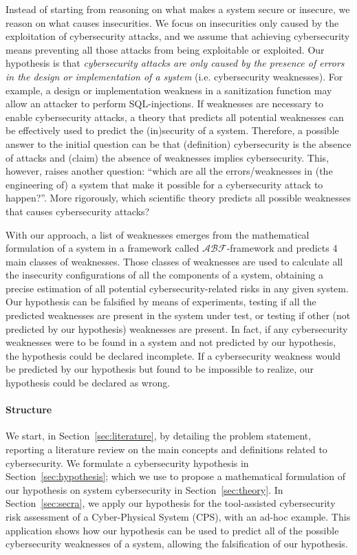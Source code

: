 \documentclass[conference]{IEEEtran}
\newcommand{\assertionRegion}{\mathcal{A}}
\newcommand{\beliefRegion}{\mathcal{B}}
\newcommand{\factRegion}{\mathcal{F}}
\newcommand{\abftheory}{\assertionRegion\beliefRegion\factRegion}
\begin{document}
Instead of starting from reasoning on what makes a system secure or insecure,
we reason on what causes insecurities. 
We focus on insecurities only caused by
the exploitation of cybersecurity attacks, and we assume that achieving
cybersecurity means preventing all those attacks from being exploitable or
exploited.  Our hypothesis is that \emph{cybersecurity attacks are only caused by the
presence of errors in the design or implementation of a system} (i.e.
cybersecurity weaknesses).  For example, a design or implementation weakness in
a sanitization function may allow an attacker to perform SQL-injections. If
weaknesses are necessary to enable cybersecurity attacks, a theory that
predicts all potential weaknesses can be effectively used to predict the
(in)security of a system.  Therefore, a possible answer to the initial question
can be that (definition) cybersecurity is the absence of attacks and (claim)
the absence of weaknesses implies cybersecurity.  This, however, raises another
question: ``which are all the errors/weaknesses in (the engineering of) a
system that make it possible for a cybersecurity attack to happen?''. More
rigorously, which scientific theory predicts all possible weaknesses that
causes cybersecurity attacks? 

With our approach, a list of weaknesses emerges from the mathematical
formulation of a system in a framework called $\abftheory$-framework and
predicts 4 main classes of weaknesses. Those classes of weaknesses are used to
calculate all the insecurity configurations of all the components of a system,
obtaining a precise estimation of all potential cybersecurity-related risks in
any given system. Our hypothesis can be falsified by means of experiments,
testing if all the predicted weaknesses are present in the system under test,
or testing if other (not predicted by our hypothesis) weaknesses are present.
In fact, if any cybersecurity weaknesses were to be found in a system and not
predicted by our hypothesis, the hypothesis could be declared incomplete.  If a
cybersecurity weakness would be predicted by our hypothesis but found to be impossible
to realize, our hypothesis could be declared as wrong.


\paragraph{Structure} 
We start, in Section~\ref{sec:literature}, by detailing the problem statement,
reporting a literature review on the main concepts and definitions related to
cybersecurity.  We formulate a cybersecurity hypothesis in Section~\ref{sec:hypothesis};
which we use to propose a mathematical formulation of our hypothesis on system cybersecurity in
Section~\ref{sec:theory}. In Section~\ref{sec:secra}, we apply our hypothesis for
the tool-assisted cybersecurity risk assessment of a Cyber-Physical System (CPS), with an ad-hoc example.
This application shows
how our hypothesis can be used to predict all of the possible cybersecurity weaknesses
of a system, allowing the falsification of our hypothesis.  
\end{document}
